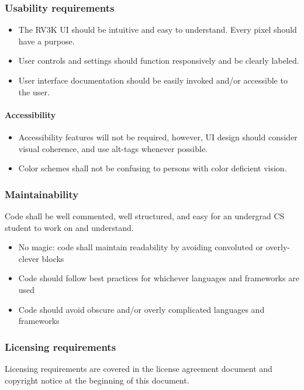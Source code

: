 \hfill \initBox

\subsubsection{Usability requirements}
\begin{itemize}
\item The RV3K UI should be intuitive and easy to understand. Every pixel should have a purpose.
\item User controls and settings should function responsively and be clearly labeled.
\item User interface documentation should be easily invoked and/or accessible to the user.
\end{itemize}
\medskip

\hfill \initBox

\paragraph{Accessibility}
\begin{itemize}
\item Accessibility features will not be required, however, UI design should consider visual coherence, and use alt-tags whenever possible.
\item Color schemes shall not be confusing to persons with color deficient vision.
\end{itemize}
\medskip

\hfill \initBox

\subsubsection{Maintainability}
Code shall be well commented, well structured, and easy for an undergrad CS student to work on and understand.

\begin{itemize}
\item No magic: code shall maintain readability by avoiding convoluted or overly-clever blocks

\item Code should follow best practices for whichever languages and frameworks are used

\item Code should avoid obscure and/or overly complicated languages and frameworks
\end{itemize}
\medskip

\hfill \initBox
\subsubsection{Licensing requirements}


Licensing requirements are covered in the license agreement document and copyright
notice at the beginning of this document.

\hfill \initBox
